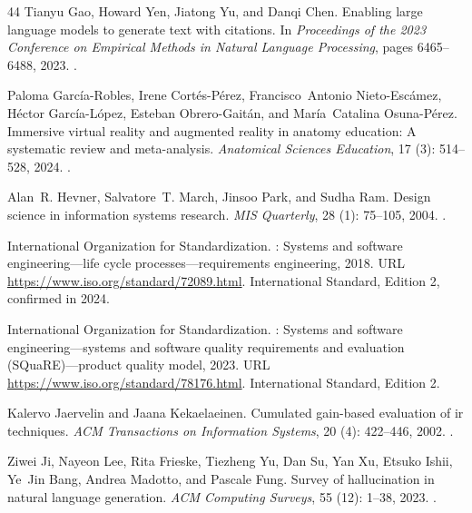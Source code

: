 \begin{thebibliography}{44}
Tianyu Gao, Howard Yen, Jiatong Yu, and Danqi Chen.
\newblock Enabling large language models to generate text with citations.
\newblock In \emph{Proceedings of the 2023 Conference on Empirical Methods in
  Natural Language Processing}, pages 6465--6488, 2023.
\newblock {}.

Paloma Garc\'ia-Robles, Irene Cort\'es-P\'erez, Francisco~Antonio
  Nieto-Esc\'amez, H\'ector Garc\'ia-L\'opez, Esteban Obrero-Gait\'an, and
  Mar\'ia~Catalina Osuna-P\'erez.
\newblock Immersive virtual reality and augmented reality in anatomy education:
  A systematic review and meta-analysis.
\newblock \emph{Anatomical Sciences Education}, 17 (3):
  514--528, 2024.
\newblock {}.

Alan~R. Hevner, Salvatore~T. March, Jinsoo Park, and Sudha Ram.
\newblock Design science in information systems research.
\newblock \emph{MIS Quarterly}, 28 (1): 75--105, 2004.
\newblock {}.

{International Organization for Standardization}.
: Systems and software engineering---life
  cycle processes---requirements engineering, 2018.
\newblock URL \url{https://www.iso.org/standard/72089.html}.
\newblock International Standard, Edition 2, confirmed in 2024.

{International Organization for Standardization}.
: Systems and software engineering---systems and
  software quality requirements and evaluation ({SQuaRE})---product quality
  model, 2023.
\newblock URL \url{https://www.iso.org/standard/78176.html}.
\newblock International Standard, Edition 2.

Kalervo Jaervelin and Jaana Kekaelaeinen.
\newblock Cumulated gain-based evaluation of ir techniques.
\newblock \emph{ACM Transactions on Information Systems}, 20
  (4): 422--446, 2002.
\newblock {}.

Ziwei Ji, Nayeon Lee, Rita Frieske, Tiezheng Yu, Dan Su, Yan Xu, Etsuko Ishii,
  Ye~Jin Bang, Andrea Madotto, and Pascale Fung.
\newblock Survey of hallucination in natural language generation.
\newblock \emph{ACM Computing Surveys}, 55 (12): 1--38, 2023.
\newblock {}.


\end{thebibliography}
